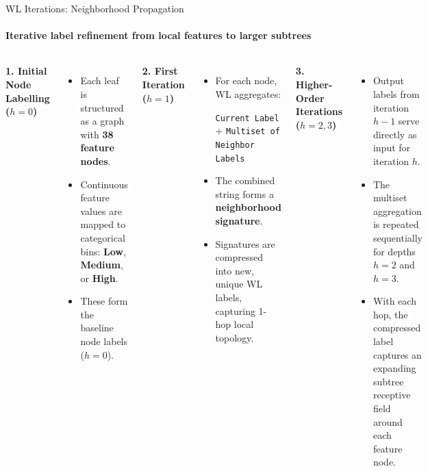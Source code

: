 \documentclass[aspectratio=169, 11pt]{beamer}
\begin{document}
\begin{frame}{WL Iterations: Neighborhood Propagation}
    \framesubtitle{Iterative label refinement from local features to larger subtrees \cite{shervashidze2011weisfeiler}}

    \begin{columns}[T]
        \textbf{1. Initial Node Labelling ($h = 0$)}
        \vspace{0.15cm}
        \begin{itemize}\footnotesize
            \item Each leaf is structured as a graph with \textbf{38 feature nodes}.
            \item Continuous feature values are mapped to categorical bins: \textbf{Low}, \textbf{Medium}, or \textbf{High}.
            \item These form the baseline node labels ($h = 0$).
        \end{itemize}

        \vspace{0.3cm}
        \textbf{2. First Iteration ($h = 1$)}
        \vspace{0.15cm}
        \begin{itemize}\footnotesize
            \item For each node, WL aggregates:
            \begin{center}
                \scriptsize\texttt{Current Label} $+$ \texttt{Multiset of Neighbor Labels}
            \end{center}
            \item The combined string forms a \textbf{neighborhood signature}.
            \item Signatures are compressed into new, unique WL labels, capturing 1-hop local topology.
        \end{itemize}

        \textbf{3. Higher-Order Iterations ($h = 2, 3$)}
        \vspace{0.15cm}
        \begin{itemize}\footnotesize
            \item Output labels from iteration $h-1$ serve directly as input for iteration $h$.
            \item The multiset aggregation is repeated sequentially for depths \textbf{$h = 2$} and \textbf{$h = 3$}.
            \item With each hop, the compressed label captures an expanding subtree receptive field around each feature node.
        \end{itemize}


\end{columns}
\end{frame}
\end{document}
